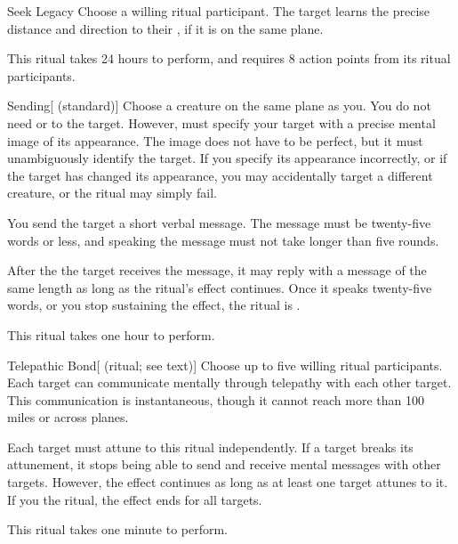 \lowercase{\hypertarget{spell:Seek Legacy}{}}\label{spell:Seek Legacy}
\begin{apability}[\nth{2}]{\hypertarget{spell:Seek Legacy}{Seek Legacy}}
Choose a willing ritual participant.
The target learns the precise distance and direction to their , if it is on the same plane.

This ritual takes 24 hours to perform, and requires 8 action points from its ritual participants.
\end{apability}
\vspace{0.25em}



\lowercase{\hypertarget{spell:Sending}{}}\label{spell:Sending}
\begin{apability}[\nth{3}]{\hypertarget{spell:Sending}{Sending}}[ (standard)]
Choose a creature on the same plane as you.
You do not need  or  to the target.
However,  must specify your target with a precise mental image of its appearance.
The image does not have to be perfect, but it must unambiguously identify the target.
If you specify its appearance incorrectly, or if the target has changed its appearance, you may accidentally target a different creature, or the ritual may simply fail.

You send the target a short verbal message.
The message must be twenty-five words or less, and speaking the message must not take longer than five rounds.

After the the target receives the message, it may reply with a message of the same length as long as the ritual's effect continues.
Once it speaks twenty-five words, or you stop sustaining the effect, the ritual is .

This ritual takes one hour to perform.
\end{apability}
\vspace{0.25em}



\lowercase{\hypertarget{spell:Telepathic Bond}{}}\label{spell:Telepathic Bond}
\begin{attuneability}[\nth{3}]{\hypertarget{spell:Telepathic Bond}{Telepathic Bond}}[ (ritual; see text)]
Choose up to five willing ritual participants.
Each target can communicate mentally through telepathy with each other target.
This communication is instantaneous, though it cannot reach more than 100 miles or across planes.

Each target must attune to this ritual independently.
If a target breaks its attunement, it stops being able to send and receive mental messages with other targets.
However, the effect continues as long as at least one target attunes to it.
If you  the ritual, the effect ends for all targets.

This ritual takes one minute to perform.
\end{attuneability}
\vspace{0.25em}



